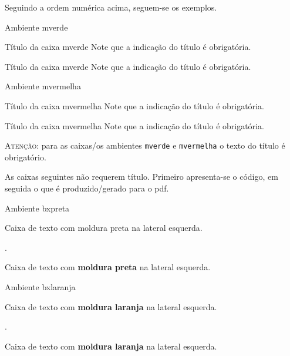 Seguindo a ordem numérica acima, seguem-se os exemplos.

\begin{codex}{Ambiente mverde}
\begin{mverde}{Título da caixa mverde}
    Note que a indicação do título é obrigatória.
\end{mverde}
\end{codex}

\begin{mverde}{Título da caixa mverde}
    Note que a indicação do título é obrigatória.
\end{mverde}

\begin{codex}{Ambiente mvermelha}
\begin{mvermelha}{Título da caixa mvermelha}
    Note que a indicação do título é obrigatória.
\end{mvermelha}
\end{codex}

\begin{mvermelha}{Título da caixa mvermelha}
    Note que a indicação do título é obrigatória.
\end{mvermelha}

\textsc{Atenção:} para as caixas/os ambientes \verb|mverde| e \verb|mvermelha| o texto do título é obrigatório.

As caixas seguintes não requerem título. Primeiro apresenta-se o código, em seguida o que é produzido/gerado para o pdf.

\begin{codex}{Ambiente bxpreta}
\begin{bxpreta}
Caixa de texto com moldura preta na lateral esquerda.    
\end{bxpreta} 
\end{codex}
.
\begin{bxpreta}
Caixa de texto com \textbf{moldura preta} na lateral esquerda.    
\end{bxpreta} 

\begin{codex}{Ambiente bxlaranja}
    \begin{bxlaranja}
        Caixa de texto com \textbf{moldura laranja} na lateral esquerda.  
    \end{bxlaranja}
 \end{codex}
.
\begin{bxlaranja}
        Caixa de texto com \textbf{moldura laranja} na lateral esquerda.  
\end{bxlaranja}



